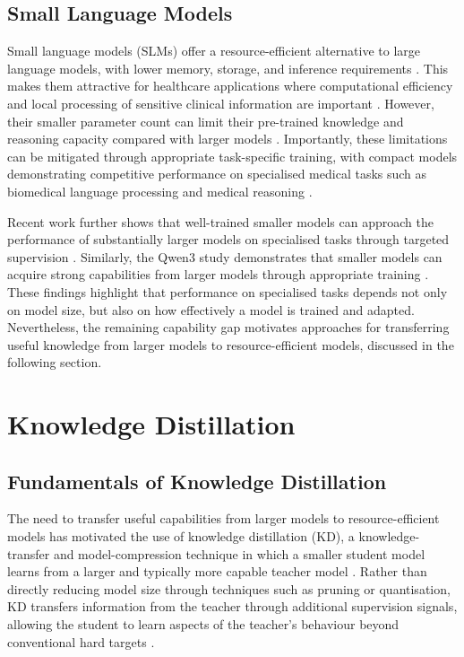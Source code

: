 \documentclass[ %
                    author={Aman Kumar Singh},
                supervisor={Dr. Edwin Simpson},
                    degree={MSc},
                     title={Quality-Aware Knowledge Distillation of Large Language Models for Efficient Personalised Clinical Report Generation},
                  subtitle={},
                      type={},
                      year={2021}]{dissertation}
\begin{document}
\subsection{Small Language Models}
\label{sec:small_language_models}
Small language models (SLMs) offer a resource-efficient alternative to large
language models, with lower memory, storage, and inference requirements
\cite{wang_comprehensive_2025}. This makes them attractive for healthcare
applications where computational efficiency and local processing of sensitive
clinical information are important \cite{garg_rise_2026}. However, their
smaller parameter count can limit their pre-trained knowledge and reasoning
capacity compared with larger models \cite{turki_evaluating_2025,wang_comprehensive_2025}.
Importantly, these limitations can be mitigated through appropriate
task-specific training, with compact models demonstrating competitive
performance on specialised medical tasks such as biomedical language
processing and medical reasoning \cite{kim_small_2025,rohanian_effectiveness_2022}.

Recent work further shows that well-trained smaller models can approach the
performance of substantially larger models on specialised tasks through
targeted supervision \cite{ye_teaching_2026}. Similarly, the Qwen3 study
demonstrates that smaller models can acquire strong capabilities from larger
models through appropriate training \cite{yang_qwen3_2025}. These findings
highlight that performance on specialised tasks depends not only on model
size, but also on how effectively a model is trained and adapted. Nevertheless,
the remaining capability gap motivates approaches for transferring useful
knowledge from larger models to resource-efficient models, discussed in the
following section.









\section{Knowledge Distillation}
\subsection{Fundamentals of Knowledge Distillation}
\label{sec:kd_fundamentals}

The need to transfer useful capabilities from larger models to
resource-efficient models has motivated the use of knowledge distillation
(KD), a knowledge-transfer and model-compression technique in which a
smaller student model learns from a larger and typically more capable teacher
model \cite{hinton_distilling_2015,wang_knowledge_2022}. Rather than directly
reducing model size through techniques such as pruning or quantisation, KD
transfers information from the teacher through additional supervision
signals, allowing the student to learn aspects of the teacher's behaviour
beyond conventional hard targets \cite{hinton_distilling_2015,mansourian_comprehensive_2025}.
\end{document}
